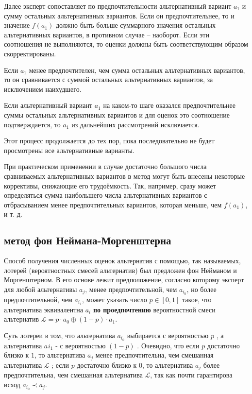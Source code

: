 \documentclass[a4paper,12pt]{extreport}
\newcommand{\Lcal}{\mathcal{L}}
\begin{document}
Далее эксперт сопоставляет по предпочтительности альтернативный вариант $a_1$ и
сумму остальных альтернативных вариантов. Если он предпочтительнее, то и значение
$f(a_1)$ должно быть больше суммарного значения остальных альтернативных вариантов,
в противном случае – наоборот. Если эти соотношения не выполняются, то оценки должны
быть соответствующим образом скорректированы.

Если $a_1$ менее предпочтителен, чем сумма остальных альтернативных вариантов, то
он сравнивается с суммой остальных альтернативных вариантов, за исключением наихудшего.

Если альтернативный вариант $a_1$ на каком-то шаге оказался предпочтительнее суммы
остальных альтернативных вариантов и для оценок это соотношение подтверждается, то
$a_1$ из дальнейших рассмотрений исключается.

Этот процесс продолжается до тех пор, пока последовательно не будет просмотрены все альтернативные варианты.

При практическом применении в случае достаточно большого числа сравниваемых альтернативных
вариантов в метод могут быть внесены некоторые коррективы, снижающие его трудоёмкость.
Так, например, сразу может определяться сумма наибольшего числа альтернативных вариантов
с отбрасыванием менее предпочтительных вариантов, которая меньше, чем $f(a_1)$, и т. д.


\subsection*{метод фон Неймана-Моргенштерна} %
\label{sub:vonNeuman_Morgnestern}

Способ получения численных оценок альтернатив с помощью, так называемых, лотерей
(вероятностных смесей альтернатив) был предложен фон Нейманом и Моргенштерном.
В его основе лежит предположение, согласно которому эксперт для любой альтернативы
$a_j$, менее предпочтительной, чем $a_{i_0}$, но более предпочтительной, чем $a_{i_1}$,
может указать число $p\in [0,1]$ такое, что альтернатива эквивалентна $a_i$ \textbf{по
проедпочтению} вероятностной смеси альтернатив $\Lcal = p\cdot a_0\oplus (1-p)\cdot a_1$.

Суть лотереи в том, что альтернатива $a_{i_0}$ выбирается с вероятностью $p$ , а
альтернатива $a_{}i_1$ - с вероятностью $(1-p)$ . Очевидно, что если $p$ достаточно
близко к $1$, то альтернатива $a_j$ менее предпочтительна, чем смешанная альтернатива
$\Lcal$ ; если $p$ достаточно близко к $0$, то альтернатива $a_j$ более предпочтительна,
чем смешанная альтернатива $\Lcal$, так как почти гарантирова исход $a_{i_0}\prec a_j$.
\end{document}
